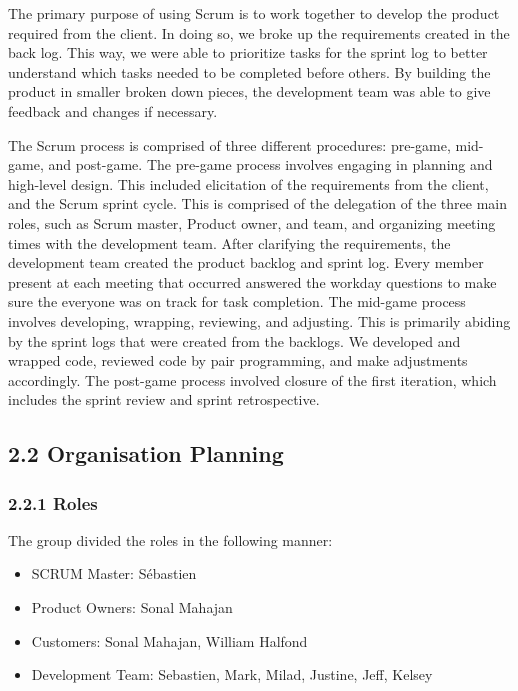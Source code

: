 \documentclass[]{article}
\begin{document}
The primary purpose of using Scrum is to work together to develop the
product required from the client. In doing so, we broke up the
requirements created in the back log. This way, we were able to
prioritize tasks for the sprint log to better understand which tasks
needed to be completed before others. By building the product in smaller
broken down pieces, the development team was able to give feedback and
changes if necessary.

The Scrum process is comprised of three different procedures: pre-game,
mid-game, and post-game. The pre-game process involves engaging in
planning and high-level design. This included elicitation of the
requirements from the client, and the Scrum sprint cycle. This is
comprised of the delegation of the three main roles, such as Scrum
master, Product owner, and team, and organizing meeting times with the
development team. After clarifying the requirements, the development
team created the product backlog and sprint log. Every member present at
each meeting that occurred answered the workday questions to make sure
the everyone was on track for task completion. The mid-game process
involves developing, wrapping, reviewing, and adjusting. This is
primarily abiding by the sprint logs that were created from the
backlogs. We developed and wrapped code, reviewed code by pair
programming, and make adjustments accordingly. The post-game process
involved closure of the first iteration, which includes the sprint
review and sprint retrospective.

\subsection{2.2 Organisation Planning}\label{organisation-planning}

\subsubsection{2.2.1 Roles}\label{roles}

The group divided the roles in the following manner:

\begin{itemize}
\itemsep1pt\parskip0pt
\item
  SCRUM Master: Sébastien
\item
  Product Owners: Sonal Mahajan
\item
  Customers: Sonal Mahajan, William Halfond
\item
  Development Team: Sebastien, Mark, Milad, Justine, Jeff, Kelsey
\end{itemize}
\end{document}
